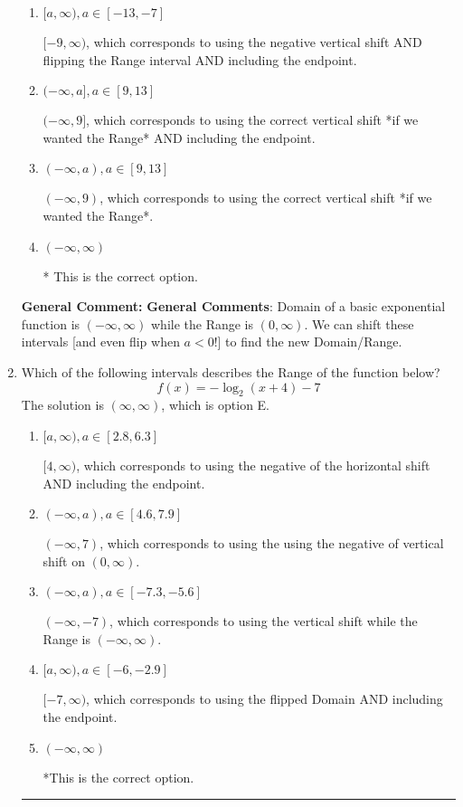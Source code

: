 \documentclass{extbook}[14pt]
\newcommand{\litem}[1]{\item #1

\rule{\textwidth}{0.4pt}}
\begin{document}
\begin{enumerate}
{\begin{enumerate}[label=\Alph*.]
$(-9, \infty)$, which corresponds to using the negative vertical shift AND flipping the Range interval.
\item \( [a, \infty), a \in [-13, -7] \)

$[-9, \infty)$, which corresponds to using the negative vertical shift AND flipping the Range interval AND including the endpoint.
\item \( (-\infty, a], a \in [9, 13] \)

$(-\infty, 9]$, which corresponds to using the correct vertical shift *if we wanted the Range* AND including the endpoint.
\item \( (-\infty, a), a \in [9, 13] \)

$(-\infty, 9)$, which corresponds to using the correct vertical shift *if we wanted the Range*.
\item \( (-\infty, \infty) \)

* This is the correct option.
\end{enumerate}

\textbf{General Comment:} \textbf{General Comments}: Domain of a basic exponential function is $(-\infty, \infty)$ while the Range is $(0, \infty)$. We can shift these intervals [and even flip when $a<0$!] to find the new Domain/Range.
}
\litem{
Which of the following intervals describes the Range of the function below?
\[ f(x) = -\log_2{(x+4)}-7 \]
The solution is \( (\infty, \infty) \), which is option E.\begin{enumerate}[label=\Alph*.]
\item \( [a, \infty), a \in [2.8, 6.3] \)

$[4, \infty)$, which corresponds to using the negative of the horizontal shift AND including the endpoint.
\item \( (-\infty, a), a \in [4.6, 7.9] \)

$(-\infty, 7)$, which corresponds to using the using the negative of vertical shift on $(0, \infty)$.
\item \( (-\infty, a), a \in [-7.3, -5.6] \)

$(-\infty, -7)$, which corresponds to using the vertical shift while the Range is $(-\infty, \infty)$.
\item \( [a, \infty), a \in [-6, -2.9] \)

$[-7, \infty)$, which corresponds to using the flipped Domain AND including the endpoint.
\item \( (-\infty, \infty) \)

*This is the correct option.
\end{enumerate}

}
\end{enumerate}
\end{document}

